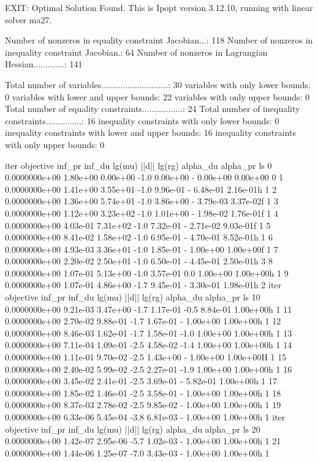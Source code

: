 EXIT: Optimal Solution Found.
This is Ipopt version 3.12.10, running with linear solver ma27.

Number of nonzeros in equality constraint Jacobian...:      118
Number of nonzeros in inequality constraint Jacobian.:       64
Number of nonzeros in Lagrangian Hessian.............:      141

Total number of variables............................:       30
                     variables with only lower bounds:        0
                variables with lower and upper bounds:       22
                     variables with only upper bounds:        0
Total number of equality constraints.................:       24
Total number of inequality constraints...............:       16
        inequality constraints with only lower bounds:        0
   inequality constraints with lower and upper bounds:       16
        inequality constraints with only upper bounds:        0

iter    objective    inf_pr   inf_du lg(mu)  ||d||  lg(rg) alpha_du alpha_pr  ls
   0  0.0000000e+00 1.80e+00 0.00e+00  -1.0 0.00e+00    -  0.00e+00 0.00e+00   0
   1  0.0000000e+00 1.41e+00 3.55e+01  -1.0 9.96e-01    -  6.48e-01 2.16e-01h  1
   2  0.0000000e+00 1.36e+00 5.74e+01  -1.0 3.86e+00    -  3.79e-03 3.37e-02f  1
   3  0.0000000e+00 1.12e+00 3.23e+02  -1.0 1.01e+00    -  1.98e-02 1.76e-01f  1
   4  0.0000000e+00 4.03e-01 7.31e+02  -1.0 7.32e-01    -  2.71e-02 9.03e-01f  1
   5  0.0000000e+00 8.41e-02 1.58e+02  -1.0 6.95e-01    -  4.70e-01 8.52e-01h  1
   6  0.0000000e+00 4.93e-03 3.36e+01  -1.0 1.85e-01    -  1.00e+00 1.00e+00f  1
   7  0.0000000e+00 2.20e-02 2.50e+01  -1.0 6.50e-01    -  4.45e-01 2.50e-01h  3
   8  0.0000000e+00 1.07e-01 5.13e+00  -1.0 3.57e-01   0.0 1.00e+00 1.00e+00h  1
   9  0.0000000e+00 1.07e-01 4.86e+00  -1.7 9.45e-01    -  3.30e-01 1.98e-01h  2
iter    objective    inf_pr   inf_du lg(mu)  ||d||  lg(rg) alpha_du alpha_pr  ls
  10  0.0000000e+00 9.21e-03 3.47e+00  -1.7 1.17e-01  -0.5 8.84e-01 1.00e+00h  1
  11  0.0000000e+00 2.70e-02 9.88e-01  -1.7 1.67e-01    -  1.00e+00 1.00e+00h  1
  12  0.0000000e+00 8.46e-03 1.62e-01  -1.7 1.58e-01  -1.0 1.00e+00 1.00e+00h  1
  13  0.0000000e+00 7.11e-04 1.09e-01  -2.5 4.58e-02  -1.4 1.00e+00 1.00e+00h  1
  14  0.0000000e+00 1.11e-01 9.70e-02  -2.5 1.43e+00    -  1.00e+00 1.00e+00H  1
  15  0.0000000e+00 2.40e-02 5.99e-02  -2.5 2.27e-01  -1.9 1.00e+00 1.00e+00h  1
  16  0.0000000e+00 3.45e-02 2.41e-01  -2.5 3.69e-01    -  5.82e-01 1.00e+00h  1
  17  0.0000000e+00 1.85e-02 1.46e-01  -2.5 3.58e-01    -  1.00e+00 1.00e+00h  1
  18  0.0000000e+00 8.37e-03 2.78e-02  -2.5 9.85e-02    -  1.00e+00 1.00e+00h  1
  19  0.0000000e+00 6.33e-06 5.45e-04  -3.8 6.81e-03    -  1.00e+00 1.00e+00h  1
iter    objective    inf_pr   inf_du lg(mu)  ||d||  lg(rg) alpha_du alpha_pr  ls
  20  0.0000000e+00 1.42e-07 2.95e-06  -5.7 1.02e-03    -  1.00e+00 1.00e+00h  1
  21  0.0000000e+00 1.44e-06 1.25e-07  -7.0 3.43e-03    -  1.00e+00 1.00e+00h  1

